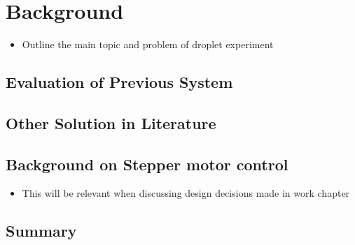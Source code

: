 \chapter{Background}\label{C:back}
\begin{itemize}
    \item Outline the main topic and problem of droplet experiment
\end{itemize}
\section{Evaluation of Previous System}

\section{Other Solution in Literature}

\section{Background on Stepper motor control}
\begin{itemize}
    \item This will be relevant when discussing design decisions made in work chapter
\end{itemize}

\section{Summary}